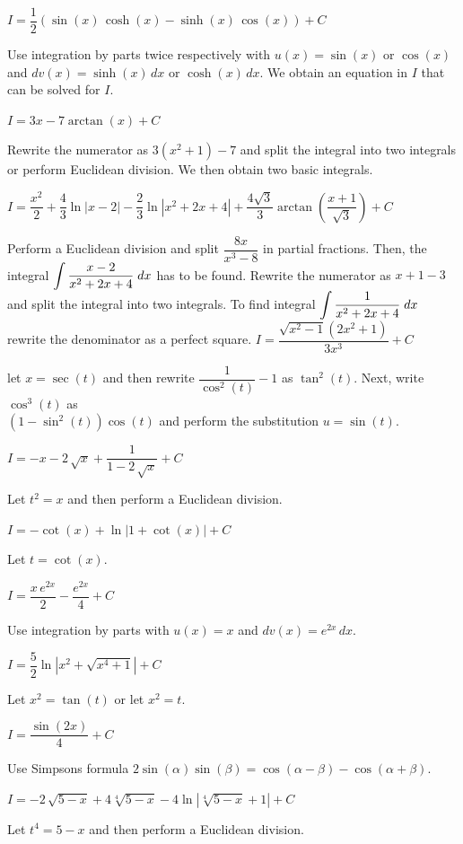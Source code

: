 \begin{Answer}
        \ifanalysis
    	\Question $I = \dfrac{1}{2} \left(\sin (x) \, \cosh (x) - \sinh (x) \, \cos (x) \right) + C $
    	
    	 Use integration by parts twice respectively with $u(x)=\sin (x)$ or $\cos (x)$ and $dv(x)= \sinh (x)\, dx$ or $\cosh (x)\,dx$. We obtain an equation in $I$ that can be solved for $I$.
        \fi	
        
        \Question $I = 3x-7 \arctan(x) + C$
        
        Rewrite the numerator as $3\left(x^2+1\right)-7$ and split the integral into two integrals or perform Euclidean division. We then obtain two basic integrals.
    		
    	\Question $I = \dfrac{x^2}{2} + \dfrac{4}{3} \ln |x-2| - \dfrac{2}{3} \ln |x^2 + 2x+ 4| + \dfrac{4\sqrt{3}}{3}\arctan \left(\dfrac{x+1}{\sqrt{3}} \right)  + C$
    	
    	 Perform a Euclidean division and split $ \dfrac{8x}{x^3-8}$ in partial fractions. Then, the integral $\displaystyle \int  \dfrac{x-2}{x^2+2x+4}\; dx$ has to be found. Rewrite the numerator as $x+1-3$ and split the integral into two  integrals. To find integral $\displaystyle \int  \dfrac{1}{x^2+2x+4}\; dx$ rewrite the denominator as a perfect square.
    	\Question $I = \dfrac{\sqrt{x^2-1}\left(2x^2+1\right)}{3x^3} + C$
    	
    	let $x=\sec (t)$ and then rewrite $\dfrac{1}{\cos^2 (t)} -1$ as $\tan^2 (t)$. Next, write $\cos^3(t)$ as \\ $(1-\sin^2(t)) \cos(t)$  and perform the substitution $u=\sin (t)$.
    		
    	\Question $I = -x-2\,\sqrt{x}+\dfrac{1}{1-2\,\sqrt{x}} + C$
    
         Let $t^2 = x$ and then perform a Euclidean division.
    		
    	\Question $I = -\cot (x) + \ln\left|1 + \cot (x) \right| + C$
    	 
    	Let $t = \cot (x)$.
    		
    	\Question $I = \dfrac{x\,e^{2x}}{2}-\dfrac{e^{2x}}{4} + C$
    	
    	Use integration by parts with $u(x)=x$ and $dv(x)= e^{2x}\, dx$. 
    		
    	\Question $I =\dfrac{5}{2} \ln \left|x^2 + \sqrt{x^4+1}\right| + C$
    
        Let $x^2=\tan (t)$ or let $x^2=t$.
    		
    	\Question $I = \dfrac{\sin (2x)}{4} + C$
    	
    	Use Simpsons formula $2 \sin (\alpha) \sin (\beta) = \cos (\alpha - \beta) - \cos (\alpha + \beta)$.
    		
    	\Question $I = -2\,\sqrt{5-x} + 4\sqrt[4]{5-x} - 4\ln|\sqrt[4]{5-x}+1| + C$
    	
    	Let $t^4 = 5-x$ and then perform a Euclidean division.

\end{Answer}

